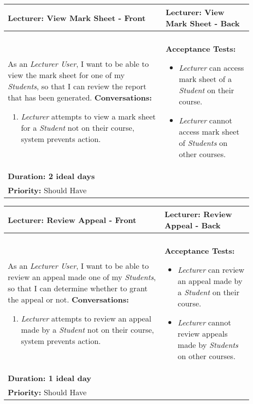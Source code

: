 \documentclass[11pt]{article}
\begin{document}
\begin{center}
\begin{tabular}{ | m{8cm}  |  m{8cm}  | } 
 \hline
 \textbf{Lecturer: View Mark Sheet - Front} &  \textbf{Lecturer: View Mark Sheet - Back}  \\ 
  \hline
&\\[5pt]
As an \emph{Lecturer User}, I want to be able to view the mark sheet for one of my \emph{Students}, so that I can review the report that has been generated.\newline
\textbf{Conversations:}
\begin{enumerate}
\item{\emph{Lecturer} attempts to view a mark sheet for a \emph{Student} not on their course, system prevents action.}
\end{enumerate}
& \textbf{Acceptance Tests:} 
\begin{itemize}
\item{\emph{Lecturer} can access mark sheet of a \emph{Student} on their course.}
\item{\emph{Lecturer} cannot access mark sheet of \emph{Students} on other courses.}
\end{itemize} \\
\textbf{Duration: 2 ideal days} &\\
\textbf{Priority:}  \textcolor{mauve}{Should Have} & \\
 \hline
\end{tabular}
\end{center}

\begin{center}
\begin{tabular}{ | m{8cm}  |  m{8cm}  | } 
 \hline
 \textbf{Lecturer: Review Appeal - Front} &  \textbf{Lecturer: Review Appeal - Back}  \\ 
  \hline
&\\[5pt]
As an \emph{Lecturer User}, I want to be able to review an appeal made one of my \emph{Students}, so that I can determine whether to grant the appeal or not.\newline
\textbf{Conversations:}
\begin{enumerate}
\item{\emph{Lecturer} attempts to review an appeal made by a \emph{Student} not on their course, system prevents action.}
\end{enumerate}
& \textbf{Acceptance Tests:} 
\begin{itemize}
\item{\emph{Lecturer} can review an appeal made by a \emph{Student} on their course.}
\item{\emph{Lecturer} cannot review appeals made by \emph{Students} on other courses.}
\end{itemize} \\
\textbf{Duration: 1 ideal day} &\\
\textbf{Priority:}  \textcolor{mauve}{Should Have} & \\
 \hline
\end{tabular}
\end{center}
\end{document}
